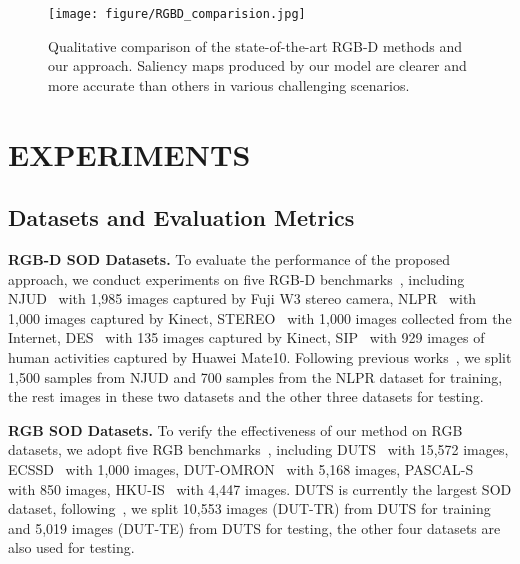 \documentclass[journal]{IEEEtran}
\begin{document}
\begin{figure*}[t]
	\begin{center}
\texttt{[image: figure/RGBD\_comparision.jpg]}
		\caption{Qualitative comparison of the state-of-the-art RGB-D methods and our approach. Saliency maps produced by our model are clearer and more accurate than others in various challenging scenarios.
		}\label{fig:RGB-D comparison}
	\end{center}
\end{figure*}




\section{EXPERIMENTS}\label{sec:experiment}

\subsection{Datasets and Evaluation Metrics}
\textbf{RGB-D SOD Datasets.} To evaluate the performance of the proposed approach, we conduct experiments on five RGB-D benchmarks~\cite{ju2014depth,peng2014rgbd,niu2012leveraging,cheng2014depth,zhu2017three}, including NJUD~\cite{ju2014depth} with 1,985 images captured by Fuji W3 stereo camera, NLPR~\cite{peng2014rgbd} with 1,000 images captured by Kinect, STEREO~\cite{niu2012leveraging} with 1,000 images collected from the Internet,  DES~\cite{cheng2014depth} with 135 images captured by Kinect, SIP~\cite{fan2019D3Net} with 929 images of human activities captured by Huawei Mate10. Following previous works~\cite{zhao2019contrast,piao2019depth}, we split 1,500 samples from NJUD and 700 samples from the NLPR dataset for training, the rest images in these two datasets and the other three datasets for testing.

\textbf{RGB SOD Datasets.} To verify the effectiveness of our method on RGB datasets, we adopt five RGB benchmarks~\cite{wang2017learning,yang2013saliency,yan2013hierarchical,li2014secrets,li2015visual}, including DUTS~\cite{wang2017learning} with 15,572 images, ECSSD~\cite{yan2013hierarchical} with 1,000 images, DUT-OMRON~\cite{yang2013saliency} with 5,168 images, PASCAL-S~\cite{li2014secrets} with 850 images, HKU-IS~\cite{li2015visual} with 4,447 images. DUTS is currently the largest SOD dataset, following~\cite{wang2017learning}, we split 10,553 images (DUT-TR) from DUTS for training and 5,019 images (DUT-TE) from DUTS for testing, the other four datasets are also used for testing.
\end{document}
